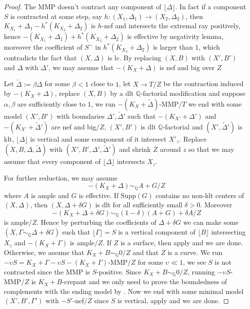 \documentclass[10pt,a4paper]{amsart}
\begin{document}
\begin{proof}
    The MMP doesn't contract any component of $\lfloor \Delta\rfloor$. In fact if a component $S$ is contracted at some step, say $h:(X_1,\Delta_1)\to (X_2,\Delta_2)$, then $K_{X_1}+\Delta_1-h^*(K_{X_2}+\Delta_2)$ is $h$-nef and intersects the extremal ray positively, hence $-(K_{X_1}+\Delta_1)+h^*(K_{X_2}+\Delta_2)$ is effective by negativity lemma, moreover the coefficient of $S^\sim$ in $h^*(K_{X_2}+\Delta_2)$ is larger than $1$, which contradicts the fact that $(X,\Delta)$ is lc. By replacing $(X,B)$ with $(X',B')$ and $\Delta$ with $\Delta'$, we may assume that $-(K_X+\Delta)$ is nef and big over $Z$ 
    
    Let $\tilde\Delta:=\beta\Delta$ for some $\beta<1$ close to $1$, let $X\to T/Z$ be the contraction induced by $-(K_X+\Delta)$, replace $(X,B)$ by a dlt ${\mathbb Q}$-factorial modification and suppose $\alpha,\beta$ are sufficiently close to $1$, we run $-(K_X+\tilde\Delta)$-MMP$/T$ we end with some model $(X',B')$ with boundaries $\Delta',\tilde\Delta'$ such that $-(K_{X'}+\Delta')$ and $-(K_{X'}+\tilde\Delta')$ are nef and big$/Z$, $(X',B')$ is dlt ${\mathbb Q}$-factorial and $(X',\tilde\Delta')$ is klt, $\lfloor \Delta\rfloor$ is vertical and some component of it intersect $X'_z$. Replace $(X,B,\Delta,\tilde \Delta)$ with $(X',B',\Delta',\tilde \Delta')$ and shrink $Z$ around $z$ so that we may assume that every component of $\lfloor \Delta\rfloor$ intersects $X_z$.

    For further reduction, we may assume \[-(K_X+\Delta)\sim_{\mathbb Q}A+G/Z\] where $A$ is ample and $G$ is effective. If $\text{Supp}(G)$ contains no non-klt centers of $(X,\Delta)$, then $(X,\Delta+\delta G)$ is dlt for all sufficiently small $\delta>0$. Moreover \[-(K_X+\Delta+\delta G)\sim_{\mathbb Q}(1-\delta)(A+G)+\delta A/Z\] is ample$/Z$. Hence by perturbing the coefficients of $\Delta+\delta G$ we can make some $(X,\Gamma\sim_{\mathbb Q}\Delta+\delta G)$ such that $\lfloor\Gamma\rfloor=S$ is a vertical component of $\lfloor B\rfloor$ intersecting $X_z$ and $-(K_X+\Gamma)$ is ample$/Z$. If $Z$ is a surface, then apply  and we are done. Otherwise, we assume that $K_X+B\sim_\mathbb Q0/Z$ and that $Z$ is a curve. We run $-\upsilon S=K_X+\Gamma-\upsilon S-(K_X+\Gamma)$-MMP$/Z$ for some $\upsilon\ll 1$, we see $S$ is not contracted since the MMP is $S$-positive. Since $K_X+B\sim_{\mathbb Q}0/Z$, running $-\upsilon S$-MMP$/Z$ is $K_X+B$-crepant and  we only need to prove the boundedness of complements with the ending model by . Now we end with some minimal model $(X',B',\Gamma')$ with $-S'$-nef$/Z$ since $S$ is vertical, apply  and we are done.
    

\end{proof}
\end{document}
